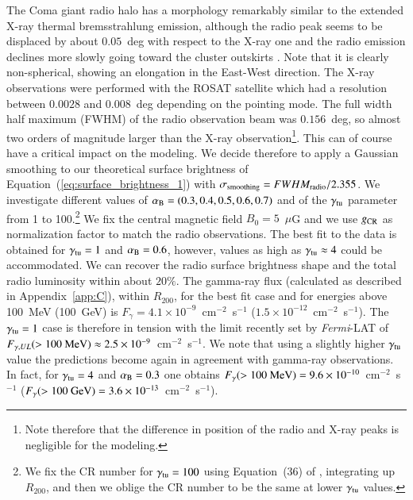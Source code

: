 \documentclass[traditabstract]{aa}
\begin{document}
The Coma giant radio halo has a morphology remarkably similar to the extended X-ray thermal bremsstrahlung emission, although the radio peak seems to be displaced by about $0.05$~deg with respect to the X-ray one and the radio emission declines more slowly going toward the cluster outskirts \citep{1992A&A...259L..31B,1997A&A...321...55D}. Note that it is clearly non-spherical, showing an elongation in the East-West direction. The \cite{1992A&A...259L..31B} X-ray observations were performed with the ROSAT satellite which had a resolution between $0.0028$ and $0.008$~deg depending on the pointing mode. The full width half maximum (FWHM) of the \cite{1997A&A...321...55D} radio observation beam was $0.156$~deg, so almost two orders of magnitude larger than the X-ray observation\footnote[12]{Note therefore that the difference in position of the radio and X-ray peaks is negligible for the modeling.}. This can of course have a critical impact on the modeling. We decide therefore to apply a Gaussian smoothing to our theoretical surface brightness of Equation~(\ref{eq:surface_brightness_1}) with $\sigma_{\rm{smoothing}} = FWHM_{\rm{radio}}/2.355$. We investigate different values of $\alpha_{\rm{B}}=(0.3,0.4,0.5,0.6,0.7)$ and of the $\gamma_{\rm{tu}}$ parameter from 1 to 100.\footnote[13]{We fix the CR number for $\gamma_{\rm{tu}}=100$ using Equation~(36) of \cite{2011A&A...527A..99E}, integrating up $R_{200}$, and then we oblige the CR number to be the same at lower $\gamma_{\rm{tu}}$ values.} We fix the central magnetic field $B_{0}=5$~$\mu$G \citep{2010A&A...513A..30B} and we use $g_{\rm{CR}}$ as normalization factor to match the radio observations. The best fit to the data is obtained for $\gamma_{\rm{tu}}=1$ and $\alpha_{\rm{B}}=0.6$, however, values as high as $\gamma_{\rm{tu}} \approx 4$ could be accommodated. We can recover the radio surface brightness shape and the total radio luminosity within about $20\%$. The gamma-ray flux (calculated as described in Appendix~\ref{app:C}), within $R_{200}$, for the best fit case and for energies above 100~MeV (100~GeV) is $F_{\gamma} = 4.1 \times 10^{-9}$~cm$^{-2}$~s$^{-1}$ ($1.5 \times 10^{-12}$~cm$^{-2}$~s$^{-1}$). The $\gamma_{\rm{tu}} = 1$ case is therefore in tension with the limit recently set by \emph{Fermi}-LAT \citep{2012AAS...21920701Z} of $F_{\gamma, UL} (>100~\rm{MeV}) \approx 2.5 \times 10^{-9}$~cm$^{-2}$~s$^{-1}$. We note that using a slightly higher $\gamma_{\rm{tu}}$ value the predictions become again in agreement with gamma-ray observations. In fact, for $\gamma_{\rm{tu}} = 4$ and $\alpha_{\rm{B}}=0.3$ one obtains $F_{\gamma} (>100~\rm{MeV}) = 9.6 \times 10^{-10}$~cm$^{-2}$~s$^{-1}$ ($F_{\gamma} (>100~\rm{GeV}) = 3.6 \times 10^{-13}$~cm$^{-2}$~s$^{-1}$). 
\end{document}
